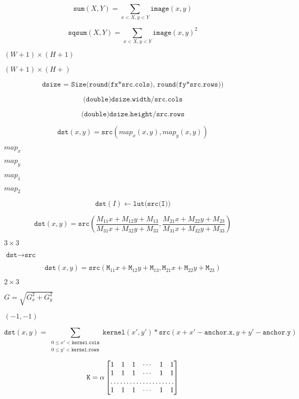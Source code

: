 \documentclass{article}
\begin{document}
\[\texttt{sum} (X,Y) = \sum _{x<X,y<Y} \texttt{image} (x,y)\]
\pagebreak

\[\texttt{sqsum} (X,Y) = \sum _{x<X,y<Y} \texttt{image} (x,y)^2\]
\pagebreak

$(W+1)\times (H+1)$
\pagebreak

$(W+1)\times (H+)$
\pagebreak

\[\texttt{dsize = Size(round(fx*src.cols), round(fy*src.rows))}\]
\pagebreak

\[\texttt{(double)dsize.width/src.cols}\]
\pagebreak

\[\texttt{(double)dsize.height/src.rows}\]
\pagebreak

\[\texttt{dst} (x,y) = \texttt{src} (map_x(x,y),map_y(x,y))\]
\pagebreak

$map_x$
\pagebreak

$map_y$
\pagebreak

$map_1$
\pagebreak

$map_2$
\pagebreak

\[\texttt{dst} (I) \leftarrow \texttt{lut(src(I))}\]
\pagebreak

\[\texttt{dst} (x,y) = \texttt{src} \left ( \frac{M_{11} x + M_{12} y + M_{13}}{M_{31} x + M_{32} y + M_{33}} , \frac{M_{21} x + M_{22} y + M_{23}}{M_{31} x + M_{32} y + M_{33}} \right )\]
\pagebreak

$3\times 3$
\pagebreak

$\texttt{dst}\rightarrow\texttt{src}$
\pagebreak

\[\texttt{dst} (x,y) = \texttt{src} ( \texttt{M} _{11} x + \texttt{M} _{12} y + \texttt{M} _{13}, \texttt{M} _{21} x + \texttt{M} _{22} y + \texttt{M} _{23})\]
\pagebreak

$2\times 3$
\pagebreak

$G = \sqrt{G_x^2 + G_y^2}$
\pagebreak

$(-1,-1)$
\pagebreak

\[\texttt{dst} (x,y) = \sum _{ \substack{0\leq x' < \texttt{kernel.cols}\\{0\leq y' < \texttt{kernel.rows}}}} \texttt{kernel} (x',y')* \texttt{src} (x+x'- \texttt{anchor.x} ,y+y'- \texttt{anchor.y} )\]
\pagebreak

\[\texttt{K} = \alpha \begin{bmatrix} 1 & 1 & 1 & \cdots & 1 & 1 \\ 1 & 1 & 1 & \cdots & 1 & 1 \\ \hdotsfor{6} \\ 1 & 1 & 1 & \cdots & 1 & 1 \end{bmatrix}\]
\pagebreak
\end{document}
